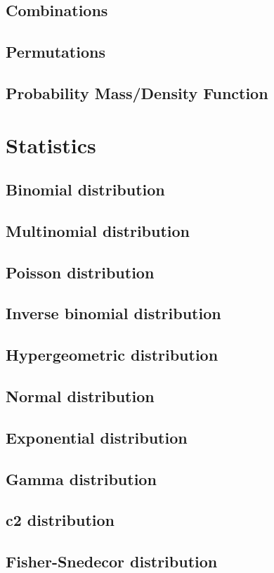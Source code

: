 \documentclass{report}
\begin{document}
	\section{Combinations}
	\section{Permutations}
	\section{Probability Mass/Density Function}

\chapter{Statistics}
	\section{Binomial distribution}
	\section{Multinomial distribution}
	\section{Poisson distribution}
	\section{Inverse binomial distribution}
	\section{Hypergeometric distribution}
	\section{Normal distribution}
	\section{Exponential distribution}
	\section{Gamma distribution}
	\section{c2 distribution}
	\section{Fisher-Snedecor distribution}
\end{document}
